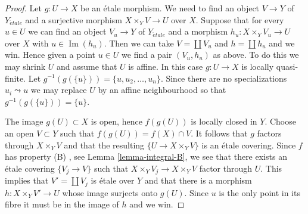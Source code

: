 \documentclass[10pt,a4paper]{amsart}
\theoremstyle{plain}
\theoremstyle{definition}
\theoremstyle{remark}
\numberwithin{equation}{subsection}
\def\etale{{\acute{e}tale}}
\def\Im{\mathop{\mathrm{Im}}}
\begin{document}
\begin{proof}
Let $g : U \to X$ be an \'etale morphism. We need to find an object
$V \to Y$ of $Y_\etale$ and a surjective morphism $X \times_Y V \to U$
over $X$. Suppose that for every $u \in U$ we can find an object
$V_u \to Y$ of $Y_\etale$ and a morphism $h_u : X \times_Y V_u \to U$
over $X$ with $u \in \Im(h_u)$. Then we can take $V = \coprod V_u$
and $h = \coprod h_u$ and we win. Hence given a point
$u \in U$ we find a pair $(V_u, h_u)$ as above. To do this we may
shrink $U$ and assume that $U$ is affine. In this case
$g : U \to X$ is locally quasi-finite. Let
$g^{-1}(g(\{u\})) = \{u, u_2, \ldots, u_n\}$. Since there are no
specializations $u_i \leadsto u$ we may replace $U$ by an affine neighbourhood
so that $g^{-1}(g(\{u\})) = \{u\}$.

\medskip\noindent
The image $g(U) \subset X$ is open,
hence $f(g(U))$ is locally closed in $Y$. Choose an open $V \subset Y$ such
that $f(g(U)) = f(X) \cap V$. It follows that $g$ factors through
$X \times_Y V$ and that the resulting $\{U \to X \times_Y V\}$ is an \'etale
covering. Since $f$ has property (B) , see
Lemma \ref{lemma-integral-B},
we see that there exists an \'etale covering $\{V_j \to V\}$ such that
$X \times_Y V_j \to X \times_Y V$ factor through $U$.
This implies that $V' = \coprod V_j$ is \'etale over $Y$ and that there is a
morphism $h : X \times_Y V' \to U$ whose image
surjects onto $g(U)$. Since $u$ is the only point in its fibre it must
be in the image of $h$ and we win.
\end{proof}
\end{document}
